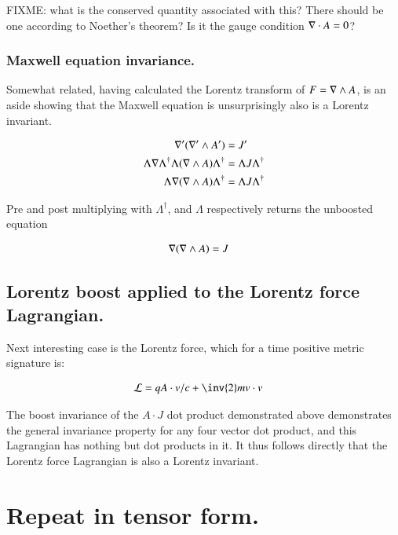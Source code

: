 FIXME: what is the conserved quantity associated with this?  There should be one according to Noether's theorem?  Is it the gauge condition $\nabla \cdot A = 0$?

\subsubsection{Maxwell equation invariance. }

Somewhat related, having calculated the Lorentz transform of $F = \nabla \wedge A$, is an aside showing that the Maxwell equation
is unsurprisingly also is a Lorentz invariant.

\begin{align*}
\nabla' (\nabla' \wedge A') &= J' \\
\Lambda \nabla \Lambda^\dagger \Lambda (\nabla \wedge A) \Lambda^\dagger &= \Lambda J \Lambda^\dagger \\
\Lambda \nabla (\nabla \wedge A) \Lambda^\dagger &= \Lambda J \Lambda^\dagger \\
\end{align*}

Pre and post multiplying with $\Lambda^\dagger$, and $\Lambda$ respectively returns the unboosted equation

\begin{align*}
\nabla (\nabla \wedge A) &= J
\end{align*}

\subsection{Lorentz boost applied to the Lorentz force Lagrangian. }

Next interesting case is the Lorentz force, which for a time positive metric 
signature is:

\begin{align*}
\LL &= q A \cdot v/c + \inv{2} m v \cdot v
\end{align*}

The boost invariance of the $A \cdot J$ dot product demonstrated above demonstrates the general invariance property for any four vector dot product, and this
Lagrangian has nothing but dot products in it.  It thus follows directly that the Lorentz force Lagrangian is also a Lorentz invariant.

\section{Repeat in tensor form. }

